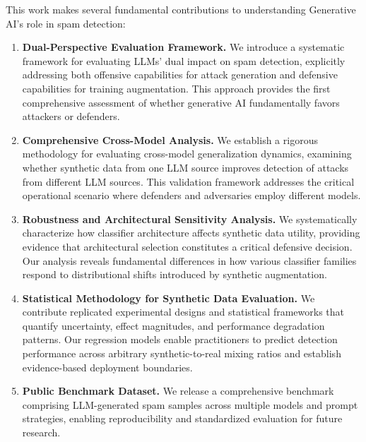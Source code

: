 This work makes several fundamental contributions to understanding Generative AI's role in spam detection:
\begin{enumerate}
    \item \textbf{Dual-Perspective Evaluation Framework.} We introduce a systematic framework for evaluating LLMs' dual impact on spam detection, explicitly addressing both offensive capabilities for attack generation and defensive capabilities for training augmentation. This approach provides the first comprehensive assessment of whether generative AI fundamentally favors attackers or defenders.

    \item \textbf{Comprehensive Cross-Model Analysis.} We establish a rigorous methodology for evaluating cross-model generalization dynamics, examining whether synthetic data from one LLM source improves detection of attacks from different LLM sources. This validation framework addresses the critical operational scenario where defenders and adversaries employ different models.

    \item \textbf{Robustness and Architectural Sensitivity Analysis.} We systematically characterize how classifier architecture affects synthetic data utility, providing evidence that architectural selection constitutes a critical defensive decision. Our analysis reveals fundamental differences in how various classifier families respond to distributional shifts introduced by synthetic augmentation.

    \item \textbf{Statistical Methodology for Synthetic Data Evaluation.} We contribute replicated experimental designs and statistical frameworks that quantify uncertainty, effect magnitudes, and performance degradation patterns. Our regression models enable practitioners to predict detection performance across arbitrary synthetic-to-real mixing ratios and establish evidence-based deployment boundaries.

    \item \textbf{Public Benchmark Dataset.} We release a comprehensive benchmark comprising LLM-generated spam samples across multiple models and prompt strategies, enabling reproducibility and standardized evaluation for future research\footnotemark[1].

\end{enumerate}

